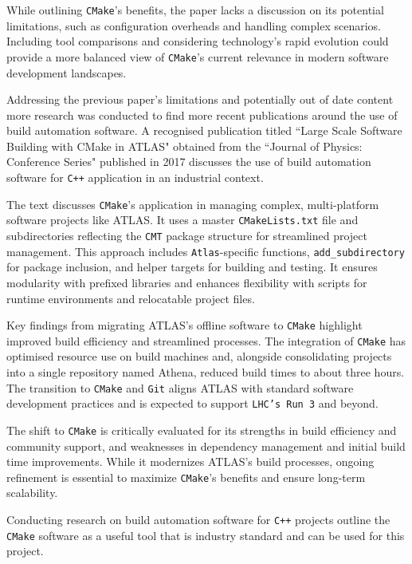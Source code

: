 While outlining \texttt{CMake}'s benefits, the paper lacks a discussion on its potential limitations, such as configuration overheads and handling complex scenarios. Including tool comparisons and considering technology's rapid evolution could provide a more balanced view of \texttt{CMake}'s current relevance in modern software development landscapes.

Addressing the previous paper's limitations and potentially out of date content more research was conducted to find more recent publications around the use of build automation software. A recognised publication titled ``Large Scale Software Building with CMake in ATLAS" obtained from the ``Journal of Physics: Conference Series" published in 2017\cite{cmake_publication_2} discusses the use of build automation software for \texttt{C++} application in an industrial context. 

The text discusses \texttt{CMake}'s application in managing complex, multi-platform software projects like ATLAS. It uses a master \texttt{CMakeLists.txt} file and subdirectories reflecting the \texttt{CMT} package structure for streamlined project management. This approach includes \texttt{Atlas}-specific functions, \texttt{add\_subdirectory} for package inclusion, and helper targets for building and testing. It ensures modularity with prefixed libraries and enhances flexibility with scripts for runtime environments and relocatable project files.

Key findings from migrating ATLAS's offline software to \texttt{CMake} highlight improved build efficiency and streamlined processes. The integration of \texttt{CMake} has optimised resource use on build machines and, alongside consolidating projects into a single repository named Athena, reduced build times to about three hours. The transition to \texttt{CMake} and \texttt{Git} aligns ATLAS with standard software development practices and is expected to support \texttt{LHC's Run 3} and beyond.

The shift to \texttt{CMake} is critically evaluated for its strengths in build efficiency and community support, and weaknesses in dependency management and initial build time improvements. While it modernizes ATLAS's build processes, ongoing refinement is essential to maximize \texttt{CMake}'s benefits and ensure long-term scalability.

Conducting research on build automation software for \texttt{C++} projects\cite{cmake_publication_1}\cite{cmake_publication_2} outline the \texttt{CMake} software as a useful tool that is industry standard and can be used for this project. 

